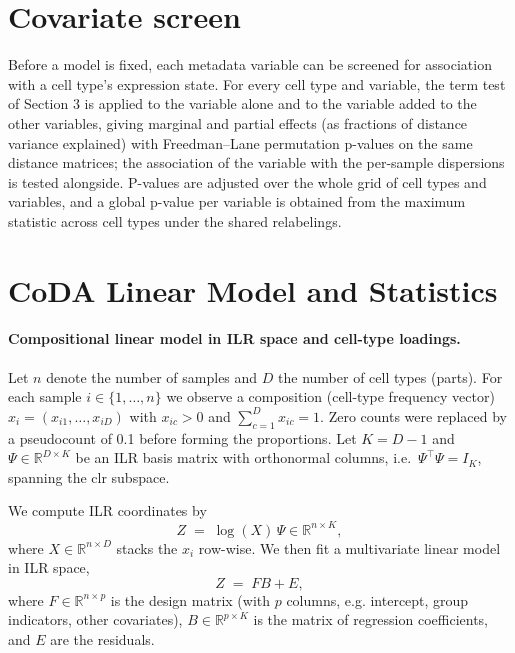 \documentclass{article}
\begin{document}
\section{Covariate screen}

Before a model is fixed, each metadata variable can be screened for association with a cell type's expression state. For every cell type and variable, the term test of Section 3 is applied to the variable alone and to the variable added to the other variables, giving marginal and partial effects (as fractions of distance variance explained) with Freedman--Lane permutation p-values on the same distance matrices; the association of the variable with the per-sample dispersions is tested alongside. P-values are adjusted over the whole grid of cell types and variables, and a global p-value per variable is obtained from the maximum statistic across cell types under the shared relabelings.

\section{CoDA Linear Model and Statistics}

\paragraph{Compositional linear model in ILR space and cell-type loadings.}
Let $n$ denote the number of samples and $D$ the number of cell types (parts). For each sample $i \in \{1,\dots,n\}$ we observe a composition (cell-type frequency vector) $x_i = (x_{i1},\dots,x_{iD})$ with $x_{ic} > 0$ and $\sum_{c=1}^D x_{ic}=1$. Zero counts were replaced by a pseudocount of 0.1 before forming the proportions. Let $K = D-1$ and $\Psi \in \mathbb{R}^{D \times K}$ be an ILR basis matrix with orthonormal columns, i.e.\ $\Psi^\top \Psi = I_K$, spanning the clr subspace.

We compute ILR coordinates by
\begin{equation}
Z \;=\; \log(X)\,\Psi \in \mathbb{R}^{n \times K},
\end{equation}
where $X \in \mathbb{R}^{n \times D}$ stacks the $x_i$ row-wise. We then fit a multivariate linear model in ILR space,
\begin{equation}
Z \;=\; F B + E,
\end{equation}
where $F \in \mathbb{R}^{n \times p}$ is the design matrix (with $p$ columns, e.g. intercept, group indicators, other covariates), $B \in \mathbb{R}^{p \times K}$ is the matrix of regression coefficients, and $E$ are the residuals.
\end{document}
